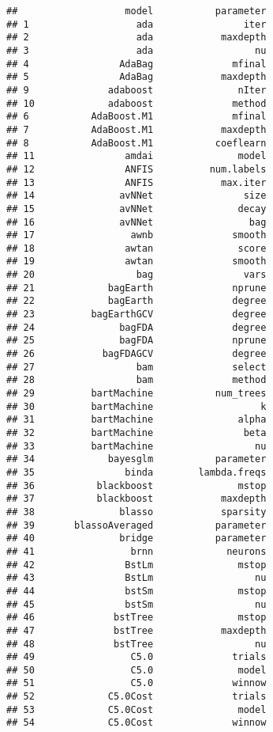\documentclass[
]{article}
\begin{document}
\begin{verbatim}
##                   model           parameter
## 1                   ada                iter
## 2                   ada            maxdepth
## 3                   ada                  nu
## 4                AdaBag              mfinal
## 5                AdaBag            maxdepth
## 9              adaboost               nIter
## 10             adaboost              method
## 6           AdaBoost.M1              mfinal
## 7           AdaBoost.M1            maxdepth
## 8           AdaBoost.M1           coeflearn
## 11                amdai               model
## 12                ANFIS          num.labels
## 13                ANFIS            max.iter
## 14               avNNet                size
## 15               avNNet               decay
## 16               avNNet                 bag
## 17                 awnb              smooth
## 18                awtan               score
## 19                awtan              smooth
## 20                  bag                vars
## 21             bagEarth              nprune
## 22             bagEarth              degree
## 23          bagEarthGCV              degree
## 24               bagFDA              degree
## 25               bagFDA              nprune
## 26            bagFDAGCV              degree
## 27                  bam              select
## 28                  bam              method
## 29          bartMachine           num_trees
## 30          bartMachine                   k
## 31          bartMachine               alpha
## 32          bartMachine                beta
## 33          bartMachine                  nu
## 34             bayesglm           parameter
## 35                binda        lambda.freqs
## 36           blackboost               mstop
## 37           blackboost            maxdepth
## 38               blasso            sparsity
## 39       blassoAveraged           parameter
## 40               bridge           parameter
## 41                 brnn             neurons
## 42                BstLm               mstop
## 43                BstLm                  nu
## 44                bstSm               mstop
## 45                bstSm                  nu
## 46              bstTree               mstop
## 47              bstTree            maxdepth
## 48              bstTree                  nu
## 49                 C5.0              trials
## 50                 C5.0               model
## 51                 C5.0              winnow
## 52             C5.0Cost              trials
## 53             C5.0Cost               model
## 54             C5.0Cost              winnow

\end{verbatim}
\end{document}
